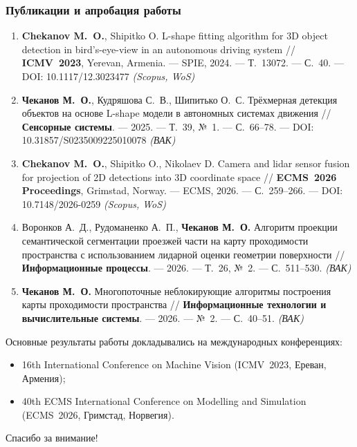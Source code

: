 \begin{frame}
    \frametitle{Публикации и апробация работы}
    \fontsize{7}{8.4}\selectfont
    \begin{enumerate}
    \item \textbf{Chekanov M.~O.}, Shipitko O. L-shape fitting algorithm for 3D object detection in bird's-eye-view in an autonomous driving system // \textbf{ICMV~2023}, Yerevan, Armenia. --- SPIE, 2024. --- Т.~13072. --- С.~40. --- DOI: 10.1117/12.3023477 \hfill \textit{(Scopus, WoS)}
    \item \textbf{Чеканов М.~О.}, Кудряшова С.~В., Шипитько О.~С. Трёхмерная детекция объектов на основе L-shape модели в автономных системах движения // \textbf{Сенсорные системы}. --- 2025. --- Т.~39, №~1. --- С.~66--78. --- DOI: 10.31857/S0235009225010078 \hfill \textit{(ВАК)}
    \item \textbf{Chekanov M.~O.}, Shipitko O., Nikolaev D. Camera and lidar sensor fusion for projection of 2D detections into 3D coordinate space // \textbf{ECMS~2026 Proceedings}, Grimstad, Norway. --- ECMS, 2026. --- С.~259--266. --- DOI: 10.7148/2026-0259 \hfill \textit{(Scopus, WoS)}
    \item Воронков А.~Д., Рудоманенко А.~П., \textbf{Чеканов М.~О.} Алгоритм проекции семантической сегментации проезжей части на карту проходимости пространства с использованием лидарной оценки геометрии поверхности // \textbf{Информационные процессы}. --- 2026. --- Т.~26, №~2. --- С.~511--530. \hfill \textit{(ВАК)}
    \item \textbf{Чеканов М.~О.} Многопоточные неблокирующие алгоритмы построения карты проходимости пространства // \textbf{Информационные технологии и вычислительные системы}. --- 2026. --- №~2. --- С.~40--51. \hfill \textit{(ВАК)}
    \end{enumerate}

    \medskip
    Основные результаты работы докладывались на международных конференциях:
    \begin{itemize}
        \item 16th International Conference on Machine Vision (ICMV~2023, Ереван, Армения);
        \item 40th ECMS International Conference on Modelling and Simulation (ECMS~2026, Гримстад, Норвегия).
    \end{itemize}
\end{frame}

\begin{frame} %
    \begin{center}
        \Huge
        Спасибо за внимание!
    \end{center}
\end{frame}

